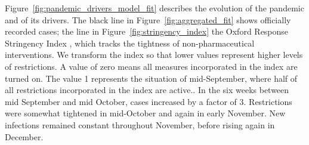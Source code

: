 Figure~\ref{fig:pandemic_drivers_model_fit} describes the evolution of the pandemic and
of its drivers. The black line in Figure~\ref{fig:aggregated_fit} shows officially
recorded cases; the  line in
Figure~\ref{fig:stringency_index} the Oxford Response Stringency Index \citep{Hale2020},
which tracks the tightness of non-pharmaceutical interventions. We transform the index so
that lower values represent higher levels of restrictions. A value of zero means all
measures incorporated in the index are turned on. The value 1 represents the situation of
mid-September, where half of all restrictions incorporated in the index are
active.. In the six weeks between mid September and mid October, cases
increased by a factor of 3.
Restrictions were somewhat tightened in mid-October and again in early November. New
infections remained constant throughout November, before rising again in December.

